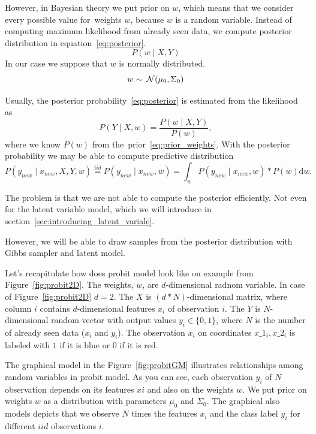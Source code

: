 However, in Bayesian theory we put prior on $w$, which means that we consider every possible value for~weights $w$, because $w$ is a random variable. Instead of computing maximum likelihood from already seen data, we compute posterior distribution in equation~\ref{eq:posterior}.
\begin{equation}\label{eq:posterior}
    P(w \mid X, Y) 
\end{equation}
In our case we suppose that $w$ is normally distributed.
\begin{equation}\label{eq:prior_weights}
w \sim \:\mathcal{N}(\mu_0, \Sigma_0)
\end{equation}

Usually, the posterior probability~\ref{eq:posterior} is estimated from the likelihood as
\begin{equation}
    P(Y \mid X, w) = \frac{P(w \mid X,Y)}{P(w)},
\end{equation}
where we know $P(w)$ from the~prior~\ref{eq:prior_weights}.
With the posterior probability we may be able to compute predictive distribution 
\begin{equation}
P(y_{new} \mid x_{new},X, Y, w) \overset{iid}{=} P(y_{new} \mid x_{new}, w) = \int_w P(y_{new} \mid x_{new}, w) * P(w) \mathrm{d} w.
\end{equation}

The problem is that we are not able to compute the posterior efficiently. Not even for the latent variable model, which we will introduce in section~\ref{sec:introducing_latent_variale}.

However, we will be able to draw samples from the posterior distribution with Gibbs sampler and latent model.

Let's recapitulate how does probit model look like on example from Figure~\ref{fig:probit2D}.
The weights, $w$, are $d$-dimensional radnom variable. In case of Figure~\ref{fig:probit2D} $d=2$.
The $X$ is $(d*N)$-dimensional matrix, where column $i$ contains $d$-dimensional features $x_i$ of observation $i$.
The $Y$ is $N$-dimensional random vector with output values $y_i \in \{0,1\}$, where $N$ is the number of already seen data ($x_i$ and $y_i$).
The observation $x_i$ on coordinates $x\_1_i,x\_2_i$ is labeled with $1$ if it is blue or $0$ if it is red.

The graphical model in the Figure~\ref{fig:probitGM} illustrates relationships among random variables in probit model. As you can see, each observation $y_i$ of $N$ observation depends on its features $xi$ and also on the weights $w$. We put prior on weights $w$ as a distribution with parameters $\mu_0$ and $\Sigma_0$. The graphical also models depicts that we observe $N$ times the features $x_i$ and the class label $y_i$ for different $iid$ observations $i$.

